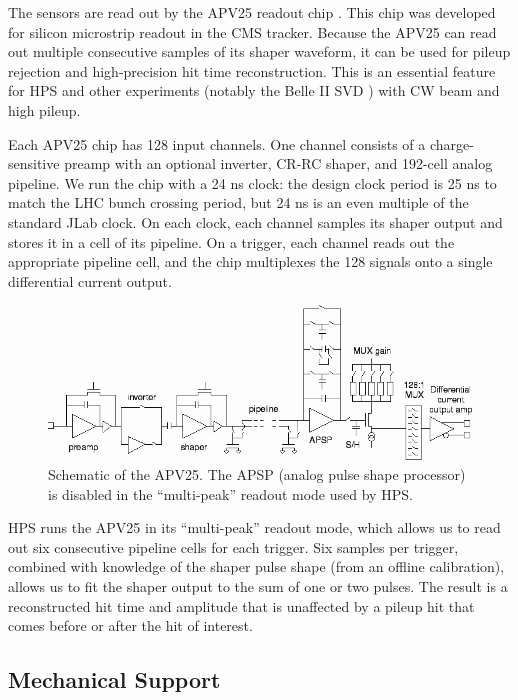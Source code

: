 The sensors are read out by the APV25 readout chip \cite{french_design_2001}.
This chip was developed for silicon microstrip readout in the CMS tracker.
Because the APV25 can read out multiple consecutive samples of its shaper waveform, it can be used for pileup rejection and high-precision hit time reconstruction.
This is an essential feature for HPS and other experiments (notably the Belle II SVD \cite{liu_belle_2012}) with CW beam and high pileup.

Each APV25 chip has 128 input channels.
One channel consists of a charge-sensitive preamp with an optional inverter, CR-RC shaper, and 192-cell analog pipeline.
We run the chip with a 24 ns clock: the design clock period is 25 ns to match the LHC bunch crossing period, but 24 ns is an even multiple of the standard JLab clock.
On each clock, each channel samples its shaper output and stores it in a cell of its pipeline.
On a trigger, each channel reads out the appropriate pipeline cell, and the chip multiplexes the 128 signals onto a single differential current output.

\begin{figure}[ht]
    \includegraphics[width=\textwidth]{detector/figs/apv25}
    \caption{Schematic of the APV25. The APSP (analog pulse shape processor) is disabled in the ``multi-peak'' readout mode used by HPS.}
    \label{fig:apv25}
\end{figure}

HPS runs the APV25 in its ``multi-peak'' readout mode, which allows us to read out six consecutive pipeline cells for each trigger.
Six samples per trigger, combined with knowledge of the shaper pulse shape (from an offline calibration), allows us to fit the shaper output to the sum of one or two pulses.
The result is a reconstructed hit time and amplitude that is unaffected by a pileup hit that comes before or after the hit of interest.

\subsection{Mechanical Support}
\label{sec:svt_mechanical}


